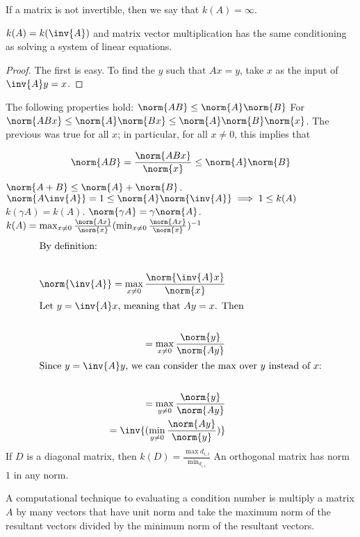 \documentclass[../main.tex]{subfiles}
\begin{document}
\begin{definition}
    If a matrix is not invertible, then we say that $k(A) = \infty$.
\end{definition}

\begin{proposition}
    $k(A) = k(\inv{A})$ and matrix vector multiplication has the same conditioning as solving a system of linear equations.
\end{proposition}

\begin{proof}
    The first is easy. To find the $y$ such that $Ax = y$, take $x$ as the input of $\inv{A}y = x$.
\end{proof}

\begin{proposition}
    \begin{outline}
        \1 The following properties hold:
        \2 $\norm{AB} \leq \norm{A} \norm{B}$
        \3 For $\norm{ABx} \leq \norm{A}\norm{Bx} \leq \norm{A} \norm{B} \norm{x}$. The previous was true for all $x$; in particular,
        for all $x \not = 0$, this implies that

        \[
            \norm{AB} = \frac{\norm{ABx}}{\norm{x}} \leq \norm{A}\norm{B}
        \]
        \2 $\norm{A + B} \leq \norm{A} + \norm{B}$.
        \2 $\norm{A \inv{A}} = 1 \leq \norm{A} \norm{\inv{A}} \implies 1 \leq k(A)$
        \1 $k(\gamma A) =  k(A)$.
        \1 $\norm{\gamma A} =  \gamma \norm{A}$.
        \1 $k(A) = \max_{x \not = 0} \frac{\norm{Ax}}{\norm{x}} (\min_{x \not = 0}\frac{\norm{Ax}}{\norm{x}})^{-1}$
        \2 
        \begin{align*}
            \intertext{By definition:} \\
            \norm{\inv{A}} = \max_{x \not = 0}\frac{\norm{\inv{A}x}}{\norm{x}} \\
            \intertext{Let $y = \inv{A}x$, meaning that $Ay = x$. Then} \\
            = \max_{x \not = 0}\frac{\norm{y}}{\norm{Ay}} \\
            \intertext{Since $y = \inv{A}y$, we can consider the $\max$ over $y$ instead of $x$:} \\
            = \max_{y \not = 0}\frac{\norm{y}}{\norm{Ay}} \\
            = \inv{(\min_{y \not = 0}\frac{\norm{Ay}}{\norm{y}})} \\
        \end{align*}
        \1 If $D$ is a diagonal matrix, then $k(D) = \frac{\max{d_{i,i}}}{\min_{d_{i,i}}}$
        \1 An orthogonal matrix has norm $1$ in any norm.
    \end{outline}
\end{proposition}

\begin{remark}
    A computational technique to evaluating a condition number is multiply a matrix $A$ by many vectors that have unit norm and take
    the maximum norm of the resultant vectors divided by the minimum norm of the resultant vectors.
\end{remark}
\end{document}
